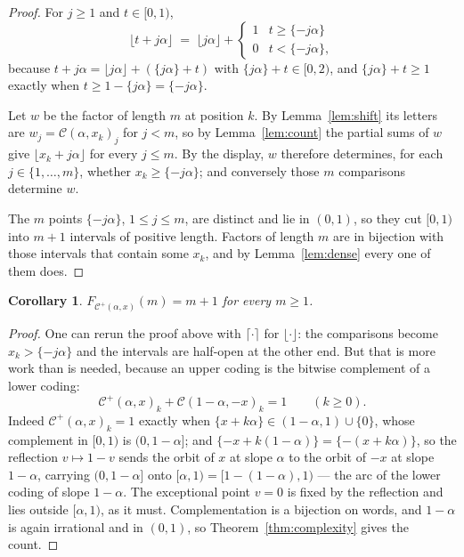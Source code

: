 \documentclass[11pt,a4paper]{article}
\newcommand{\C}{\mathcal{C}}
\newcommand{\Cp}{\mathcal{C}^{+}}
\theoremstyle{definition}
\theoremstyle{plain}
\newtheorem{corollary}[definition]{Corollary}
\begin{document}
\begin{proof}
For $j \geq 1$ and $t \in [0,1)$,
\[
  \lfloor t + j\alpha \rfloor \;=\; \lfloor j\alpha \rfloor +
  \begin{cases} 1 & t \geq \{-j\alpha\} \\ 0 & t < \{-j\alpha\} ,\end{cases}
\]
because $t + j\alpha = \lfloor j\alpha\rfloor + (\{j\alpha\} + t)$ with
$\{j\alpha\} + t \in [0,2)$, and $\{j\alpha\} + t \geq 1$ exactly when
$t \geq 1 - \{j\alpha\} = \{-j\alpha\}$.

Let $w$ be the factor of length $m$ at position $k$. By Lemma~\ref{lem:shift}
its letters are $w_j = \C(\alpha,x_k)_j$ for $j < m$, so by
Lemma~\ref{lem:count} the partial sums of $w$ give $\lfloor x_k + j\alpha\rfloor$
for every $j \leq m$. By the display, $w$ therefore determines, for each
$j \in \{1,\ldots,m\}$, whether $x_k \geq \{-j\alpha\}$; and conversely those
$m$ comparisons determine $w$.

The $m$ points $\{-j\alpha\}$, $1 \leq j \leq m$, are distinct and lie in
$(0,1)$, so they cut $[0,1)$ into $m+1$ intervals of positive length. Factors
of length $m$ are in bijection with those intervals that contain some $x_k$, and
by Lemma~\ref{lem:dense} every one of them does.
\end{proof}

\begin{corollary}\label{cor:complexityup}
$F_{\Cp(\alpha,x)}(m) = m+1$ for every $m \geq 1$.
\end{corollary}

\begin{proof}
One can rerun the proof above with $\lceil\cdot\rceil$ for
$\lfloor\cdot\rfloor$: the comparisons become $x_k > \{-j\alpha\}$ and the
intervals are half-open at the other end. But that is more work than is needed,
because an upper coding is the bitwise complement of a lower coding:
\[
  \Cp(\alpha,x)_k + \C(1-\alpha,-x)_k = 1 \qquad (k \geq 0).
\]
Indeed $\Cp(\alpha,x)_k = 1$ exactly when
$\{x+k\alpha\} \in (1-\alpha,1) \cup \{0\}$, whose complement in $[0,1)$ is
$(0,1-\alpha]$; and $\{-x + k(1-\alpha)\} = \{-(x+k\alpha)\}$, so the
reflection $v \mapsto 1-v$ sends the orbit of $x$ at slope $\alpha$ to the
orbit of $-x$ at slope $1-\alpha$, carrying $(0,1-\alpha]$ onto
$[\alpha,1) = [1-(1-\alpha),1)$ --- the arc of the lower coding of slope
$1-\alpha$. The exceptional point $v = 0$ is fixed by the reflection and lies
outside $[\alpha,1)$, as it must. Complementation is a bijection on words, and
$1-\alpha$ is again irrational and in $(0,1)$, so
Theorem~\ref{thm:complexity} gives the count.
\end{proof}
\end{document}
